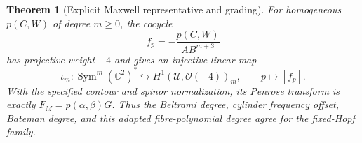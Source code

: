 \documentclass[aps,prd,reprint,nofootinbib,superscriptaddress]{revtex4-2}
\newtheorem{theorem}{Theorem}[section]
\theoremstyle{definition}
\theoremstyle{remark}
\newcommand{\C}{\mathbb{C}}
\newcommand{\cO}{\mathcal{O}}
\newcommand{\cU}{\mathcal{U}}
\newcommand{\Sym}{\operatorname{Sym}}
\begin{document}
\begin{theorem}[Explicit Maxwell representative and grading]
\label{thm:ExplicitPenrose}
For homogeneous $p(C,W)$ of degree $m\ge0$, the cocycle
\begin{equation}
f_p=-\frac{p(C,W)}{A B^{m+3}}
\label{eq:ExplicitMaxwellCocycle}
\end{equation}
has projective weight $-4$ and gives an injective linear map
\begin{equation}
\iota_m:\Sym^m(\C^2)^*\hookrightarrow
H^1(\cU,\cO(-4))_m,\qquad p\mapsto[f_p].
\label{eq:NullEmbedding}
\end{equation}
With the specified contour and spinor normalization, its Penrose transform is exactly $F_M=p(\alpha,\beta)G$. Thus the Beltrami degree, cylinder frequency offset, Bateman degree, and this adapted fibre-polynomial degree agree for the fixed-Hopf family.
\end{theorem}
\end{document}

